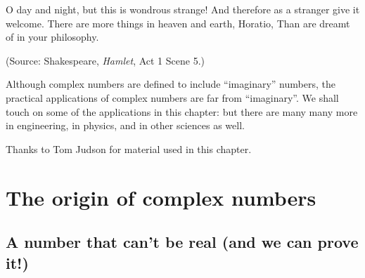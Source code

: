 

\begin{dialogue}
 O day and night, but this is wondrous strange!
 And therefore as a stranger give it welcome.
There are more things in heaven and earth, Horatio,
Than are dreamt of in your philosophy.
\noindent
\end{dialogue}
(Source: Shakespeare, \emph{Hamlet}, Act 1 Scene 5.)
\bigskip

Although complex numbers are defined to include ``imaginary'' numbers, the practical applications of complex numbers are far from ``imaginary''.  We shall touch on some of the applications in this chapter: but there are many many more in engineering, in physics, and in other sciences as well.
\medskip

Thanks to Tom Judson for material used in this chapter.

\section{The origin of complex numbers\quad{}}\label{origin_complex}

\subsection{A number that can't be real (and we can prove it!)}

